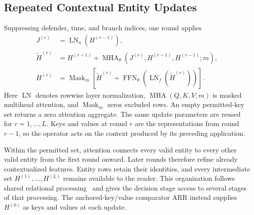 \subsection{Repeated Contextual Entity Updates}
Suppressing defender, time, and branch indices, one round applies
\begin{align}
 J^{(r)}&=\operatorname{LN}_a(H^{(r-1)}),\nonumber\\
 \widetilde H^{(r)}&=H^{(r-1)}
       +\operatorname{MHA}_{\theta}(J^{(r)},H^{(r-1)},H^{(r-1)};m),\nonumber\\
 H^{(r)}&=\operatorname{Mask}_{m}\!\left[\widetilde H^{(r)}
       +\operatorname{FFN}_{\theta}
                  (\operatorname{LN}_f(\widetilde H^{(r)}))\right].
 \label{eq:loop}
\end{align}
Here $\operatorname{LN}$ denotes rowwise layer normalization, $\operatorname{MHA}(Q,K,V;m)$ is masked multihead attention, and $\operatorname{Mask}_m$ zeros excluded rows. An empty permitted-key set returns a zero attention aggregate. The same update parameters are reused for $r=1,\ldots,L$. Keys and values at round $r$ are the representations from round $r-1$, so the operator acts on the context produced by its preceding application.

Within the permitted set, attention connects every valid entity to every other valid entity from the first round onward. Later rounds therefore refine already contextualized features. Entity rows retain their identities, and every intermediate set $H^{(1)},\ldots,H^{(L)}$ remains available to the reader. This organization follows shared relational processing~\cite{zambaldi2019relational,dehghani2019universal} and gives the decision stage access to several stages of that processing. The anchored-key/value comparator ARR instead supplies $H^{(0)}$ as keys and values at each update.

